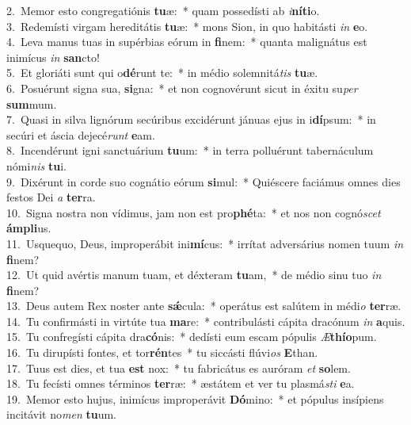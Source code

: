{2.~}Memor esto congregatiónis \textbf{tu}æ:~* quam possedísti ab \textit{i}\textbf{ní}\textbf{ti}o.\\
{3.~}Redemísti virgam hereditátis \textbf{tu}æ:~* mons Sion, in quo habitásti \textit{in} \textbf{e}o.\\
{4.~}Leva manus tuas in supérbias eórum in \textbf{fi}nem:~* quanta malignátus est inimícus \textit{in} \textbf{san}cto!\\
{5.~}Et gloriáti sunt qui o\textbf{dé}runt te:~* in médio solemnitá\textit{tis} \textbf{tu}æ.\\
{6.~}Posuérunt signa sua, \textbf{si}gna:~* et non cognovérunt sicut in éxitu su\textit{per} \textbf{sum}mum.\\
{7.~}Quasi in silva lignórum secúribus excidérunt jánuas ejus in i\textbf{dí}psum:~* in secúri et áscia dejecé\textit{runt} \textbf{e}am.\\
{8.~}Incendérunt igni sanctuárium \textbf{tu}um:~* in terra polluérunt tabernáculum nómi\textit{nis} \textbf{tu}i.\\
{9.~}Dixérunt in corde suo cognátio eórum \textbf{si}mul:~* Quiéscere faciámus omnes dies festos Dei \textit{a} \textbf{ter}ra.\\
{10.~}Signa nostra non vídimus, jam non est pro\textbf{phé}ta:~* et nos non cognó\textit{scet} \textbf{ám}\textbf{pli}us.\\
{11.~}Usquequo, Deus, improperábit ini\textbf{mí}cus:~* irrítat adversárius nomen tuum \textit{in} \textbf{fi}nem?\\
{12.~}Ut quid avértis manum tuam, et déxteram \textbf{tu}am,~* de médio sinu tuo \textit{in} \textbf{fi}nem?\\
{13.~}Deus autem Rex noster ante \textbf{sǽ}cula:~* operátus est salútem in médi\textit{o} \textbf{ter}ræ.\\
{14.~}Tu confirmásti in virtúte tua \textbf{ma}re:~* contribulásti cápita dracónum \textit{in} \textbf{a}quis.\\
{15.~}Tu confregísti cápita dra\textbf{có}nis:~* dedísti eum escam pópulis \textit{Æ}\textbf{thí}\textbf{o}pum.\\
{16.~}Tu dirupísti fontes, et tor\textbf{rén}tes~* tu siccásti flúvi\textit{os} \textbf{E}than.\\
{17.~}Tuus est dies, et tua \textbf{est} nox:~* tu fabricátus es auróram \textit{et} \textbf{so}lem.\\
{18.~}Tu fecísti omnes términos \textbf{ter}ræ:~* æstátem et ver tu plasmá\textit{sti} \textbf{e}a.\\
{19.~}Memor esto hujus, inimícus improperávit \textbf{Dó}mino:~* et pópulus insípiens incitávit no\textit{men} \textbf{tu}um.\\
